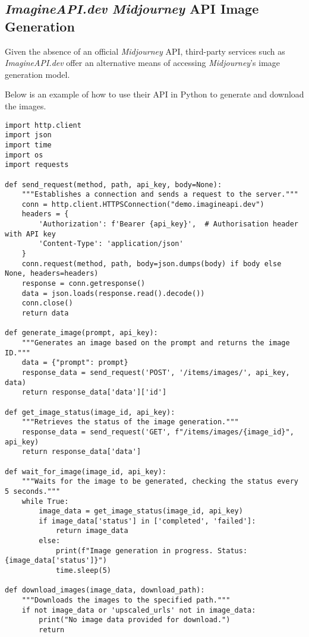 \subsection{\textit{ImagineAPI.dev} \textit{Midjourney} API Image Generation}

Given the absence of an official \textit{Midjourney} API, third-party services such as \textit{ImagineAPI.dev} offer an alternative means of accessing \textit{Midjourney}'s image generation model. 

Below is an example of how to use their API in Python to generate and download the images.

\begin{lstlisting}
import http.client
import json
import time
import os
import requests

def send_request(method, path, api_key, body=None):
    """Establishes a connection and sends a request to the server."""
    conn = http.client.HTTPSConnection("demo.imagineapi.dev")
    headers = {
        'Authorization': f'Bearer {api_key}',  # Authorisation header with API key
        'Content-Type': 'application/json'
    }
    conn.request(method, path, body=json.dumps(body) if body else None, headers=headers)
    response = conn.getresponse()
    data = json.loads(response.read().decode())
    conn.close()
    return data

def generate_image(prompt, api_key):
    """Generates an image based on the prompt and returns the image ID."""
    data = {"prompt": prompt}
    response_data = send_request('POST', '/items/images/', api_key, data)
    return response_data['data']['id']

def get_image_status(image_id, api_key):
    """Retrieves the status of the image generation."""
    response_data = send_request('GET', f"/items/images/{image_id}", api_key)
    return response_data['data']

def wait_for_image(image_id, api_key):
    """Waits for the image to be generated, checking the status every 5 seconds."""
    while True:
        image_data = get_image_status(image_id, api_key)
        if image_data['status'] in ['completed', 'failed']:
            return image_data
        else:
            print(f"Image generation in progress. Status: {image_data['status']}")
            time.sleep(5)

def download_images(image_data, download_path):
    """Downloads the images to the specified path."""
    if not image_data or 'upscaled_urls' not in image_data:
        print("No image data provided for download.")
        return


\end{lstlisting}
